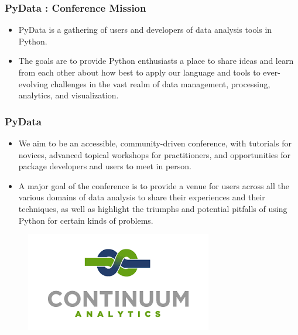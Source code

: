 \documentclass[MASTER.tex]{subfiles}
\begin{document}
\begin{frame}
	\frametitle{PyData :  Conference Mission}
	\large
	
	\begin{itemize}
	\item PyData is a gathering of users and developers of data analysis tools in Python. \bigskip
	\item The goals are to provide Python enthusiasts a place to share ideas and learn from each other about how best to apply our language and tools to ever-evolving challenges in the vast realm of data management, processing, analytics, and visualization.
	\end{itemize}

	
\end{frame}
\begin{frame}
	\large
	\frametitle{PyData}
	\large
	\begin{itemize}
		\item We aim to be an accessible, community-driven conference, with tutorials for novices, advanced topical workshops for practitioners, and opportunities for package developers and users to meet in person.
		
		\item A major goal of the conference is to provide a venue for users across all the various domains of data analysis to share their experiences and their techniques, as well as highlight the triumphs and potential pitfalls of using Python for certain kinds of problems.
	\end{itemize}
\end{frame}
\begin{frame}
\begin{figure}
\centering
\includegraphics[width=1.0\linewidth]{continuum}
\end{figure}
	\end{frame}
\end{document}
